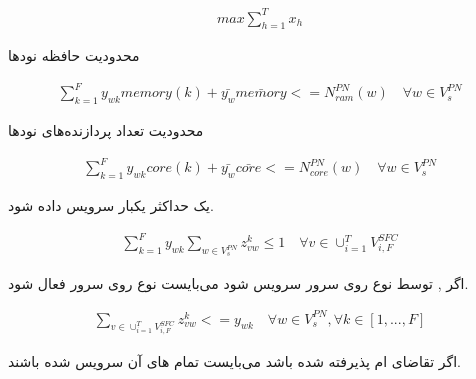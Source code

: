 \documentclass{beamer}
\begin{document}
\begin{persian}
\begin{frame}
\end{frame}
\begin{frame}
	\begin{latin}\begin{align}
	max \sum_{h=1}^Tx_h
	\end{align}\end{latin}
\end{frame}
\begin{frame}
	\par
	محدودیت حافظه نودها
	\begin{latin}\begin{align}
	\sum_{k=1}^Fy_{wk} memory(k) + \bar{y_w} \bar{memory} <= N_{ram}^{PN}(w)
	\quad
	\forall w \in V_s^{PN}
	\end{align}\end{latin}
	\par
	محدودیت تعداد پردازنده‌های نودها
	\begin{latin}\begin{align}
	\sum_{k=1}^Fy_{wk} core(k) + \bar{y_w} \bar{core} <= N_{core}^{PN}(w)
	\quad
	\forall w \in V_s^{PN}
	\end{align}\end{latin}
\end{frame}
\begin{frame}
	\par
	یک  حداکثر یکبار سرویس داده شود.
	\begin{latin}\begin{align}
	\sum_{k=1}^Fy_{wk}\sum_{w \in V_s^{PN}} z_{vw}^{k} \le 1
	\quad
	\forall v \in \cup_{i=1}^T V_{i, F}^{SFC}
	\end{align}\end{latin}
	\par
	اگر , 
	توسط  نوع 
	روی سرور  سرویس شود می‌بایست
	 نوع 
	روی سرور  فعال شود.
	\begin{latin}\begin{align}
	\sum_{v \in \cup_{i=1}^T V_{i, F}^{SFC}} z_{vw}^k <= y_{wk}
	\quad
	\forall w \in V_s^{PN}, \forall k \in [1, ..., F]
	\end{align}\end{latin}
\end{frame}
\begin{frame}
	\par
	اگر تقاضای ام پذیرفته شده باشد
	می‌بایست تمام های آن‌
	سرویس شده باشند.
	\begin{latin}\begin{align}

\end{align}
\end{latin}
\end{frame}
\end{persian}
\end{document}
